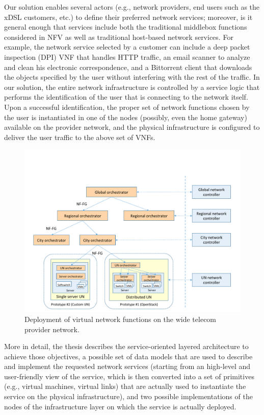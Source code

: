 Our solution enables several actors (e.g., network providers, end users such as the xDSL customers, etc.) to define their preferred network services; moreover, is it general enough 
that services include both the traditional middlebox functions considered in NFV as well as traditional host-based network services.
For example, the network service selected by a customer can include a deep packet inspection (DPI) VNF that handles HTTP traffic, an email scanner to analyze and clean his electronic correspondence, and a Bittorrent client that downloads the objects specified by the user without interfering with the rest of the traffic.
In our solution, the entire network infrastructure is controlled by a service logic that performs the identification of the user that is connecting to the network itself.
Upon a successful identification, the proper set of network functions chosen by the user is instantiated in one of the nodes (possibly, even the home gateway) available on the provider network, and the physical infrastructure is configured to deliver the user traffic to the above set of VNFs.

\begin{figure}%
	\centering
	\includegraphics[clip= true, width= 0.7\columnwidth, trim= 0in 0.5in 0.0in 0.5in, page= 33]{images/Pictures_definitivo.pdf}
	\caption{Deployment of virtual network functions on the wide telecom provider network.}
	\label{fig:ISPnetwork}
\end{figure}

More in detail, the thesis describes the service-oriented layered architecture to achieve those objectives, a possible set of data models that are used to describe and implement the requested network services (starting from an high-level and user-friendly view of the service, which is then converted into a set of primitives (e.g., virtual machines, virtual links) that are actually used to instantiate the service on the physical infrastructure), and two possible implementations of the nodes of the infrastructure layer on which the service is actually deployed.

